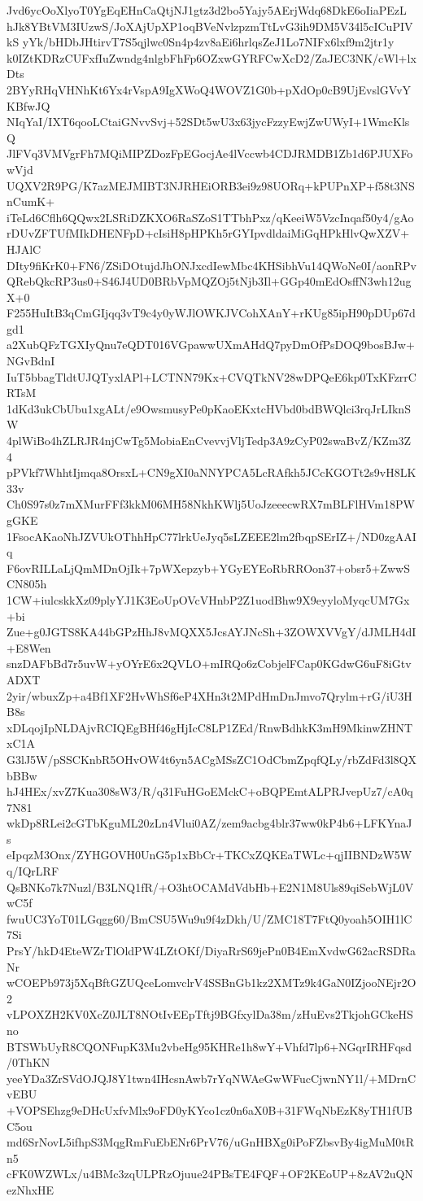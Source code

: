 Jvd6ycOoXlyoT0YgEqEHnCaQtjNJ1gtz3d2bo5Yajy5AErjWdq68DkE6oIiaPEzL
hJk8YBtVM3IUzwS/JoXAjUpXP1oqBVeNvlzpzmTtLvG3ih9DM5V34l5cICuPIVkS
yYk/bHDbJHtirvT7S5qjlwc0Sn4p4zv8aEi6hrlqsZeJ1Lo7NIFx6lxf9m2jtr1y
k0IZtKDRzCUFxfIuZwndg4nlgbFhFp6OZxwGYRFCwXcD2/ZaJEC3NK/cWl+lxDts
2BYyRHqVHNhKt6Yx4rVspA9IgXWoQ4WOVZ1G0b+pXdOp0cB9UjEvslGVvYKBfwJQ
NIqYaI/IXT6qooLCtaiGNvvSvj+52SDt5wU3x63jycFzzyEwjZwUWyI+1WmcKlsQ
JlFVq3VMVgrFh7MQiMIPZDozFpEGocjAe4lVccwb4CDJRMDB1Zb1d6PJUXFowVjd
UQXV2R9PG/K7azMEJMIBT3NJRHEiORB3ei9z98UORq+kPUPnXP+f58t3NSnCumK+
iTeLd6Cflh6QQwx2LSRiDZKXO6RaSZoS1TTbhPxz/qKeeiW5VzcInqaf50y4/gAo
rDUvZFTUfMIkDHENFpD+cIsiH8pHPKh5rGYIpvdldaiMiGqHPkHlvQwXZV+HJAlC
DIty9fiKrK0+FN6/ZSiDOtujdJhONJxcdIewMbc4KHSibhVu14QWoNe0I/aonRPv
QRebQkcRP3us0+S46J4UD0BRbVpMQZOj5tNjb3Il+GGp40mEdOsffN3wh12ugX+0
F255HuItB3qCmGIjqq3vT9c4y0yWJlOWKJVCohXAnY+rKUg85ipH90pDUp67dgd1
a2XubQFzTGXIyQnu7eQDT016VGpawwUXmAHdQ7pyDmOfPsDOQ9bosBJw+NGvBdnI
IuT5bbagTldtUJQTyxlAPl+LCTNN79Kx+CVQTkNV28wDPQeE6kp0TxKFzrrCRTsM
1dKd3ukCbUbu1xgALt/e9OwsmusyPe0pKaoEKxtcHVbd0bdBWQlci3rqJrLIknSW
4plWiBo4hZLRJR4njCwTg5MobiaEnCvevvjVljTedp3A9zCyP02swaBvZ/KZm3Z4
pPVkf7WhhtIjmqa8OrsxL+CN9gXI0aNNYPCA5LcRAfkh5JCcKGOTt2s9vH8LK33v
Ch0S97s0z7mXMurFFf3kkM06MH58NkhKWlj5UoJzeeecwRX7mBLFlHVm18PWgGKE
1FsocAKaoNhJZVUkOThhHpC77lrkUeJyq5sLZEEE2lm2fbqpSErIZ+/ND0zgAAIq
F6ovRILLaLjQmMDnOjIk+7pWXepzyb+YGyEYEoRbRROon37+obsr5+ZwwSCN805h
1CW+iulcskkXz09plyYJ1K3EoUpOVcVHnbP2Z1uodBhw9X9eyyloMyqcUM7Gx+bi
Zue+g0JGTS8KA44bGPzHhJ8vMQXX5JcsAYJNcSh+3ZOWXVVgY/dJMLH4dI+E8Wen
snzDAFbBd7r5uvW+yOYrE6x2QVLO+mIRQo6zCobjelFCap0KGdwG6uF8iGtvADXT
2yir/wbuxZp+a4Bf1XF2HvWhSf6eP4XHn3t2MPdHmDnJmvo7Qrylm+rG/iU3HB8s
xDLqojIpNLDAjvRCIQEgBHf46gHjIcC8LP1ZEd/RnwBdhkK3mH9MkinwZHNTxC1A
G3lJ5W/pSSCKnbR5OHvOW4t6yn5ACgMSsZC1OdCbmZpqfQLy/rbZdFd3l8QXbBBw
hJ4HEx/xvZ7Kua308sW3/R/q31FuHGoEMckC+oBQPEmtALPRJvepUz7/cA0q7N81
wkDp8RLei2cGTbKguML20zLn4Vlui0AZ/zem9acbg4blr37ww0kP4b6+LFKYnaJs
eIpqzM3Onx/ZYHGOVH0UnG5p1xBbCr+TKCxZQKEaTWLc+qjIIBNDzW5Wq/IQrLRF
QsBNKo7k7Nuzl/B3LNQ1fR/+O3htOCAMdVdbHb+E2N1M8Uls89qiSebWjL0VwC5f
fwuUC3YoT01LGqgg60/BmCSU5Wu9u9f4zDkh/U/ZMC18T7FtQ0yoah5OIH1lC7Si
PrsY/hkD4EteWZrTlOldPW4LZtOKf/DiyaRrS69jePn0B4EmXvdwG62acRSDRaNr
wCOEPb973j5XqBftGZUQceLomvclrV4SSBnGb1kz2XMTz9k4GaN0IZjooNEjr2O2
vLPOXZH2KV0XcZ0JLT8NOtIvEEpTftj9BGfxylDa38m/zHuEvs2TkjohGCkeHSno
BTSWbUyR8CQONFupK3Mu2vbeHg95KHRe1h8wY+Vhfd7lp6+NGqrIRHFqsd/0ThKN
yeeYDa3ZrSVdOJQJ8Y1twn4IHcsnAwb7rYqNWAeGwWFucCjwnNY1l/+MDrnCvEBU
+VOPSEhzg9eDHcUxfvMlx9oFD0yKYco1cz0n6aX0B+31FWqNbEzK8yTH1fUBC5ou
md6SrNovL5ifhpS3MqgRmFuEbENr6PrV76/uGnHBXg0iPoFZbsvBy4igMuM0tRn5
cFK0WZWLx/u4BMc3zqULPRzOjuue24PBsTE4FQF+OF2KEoUP+8zAV2uQNezNhxHE
